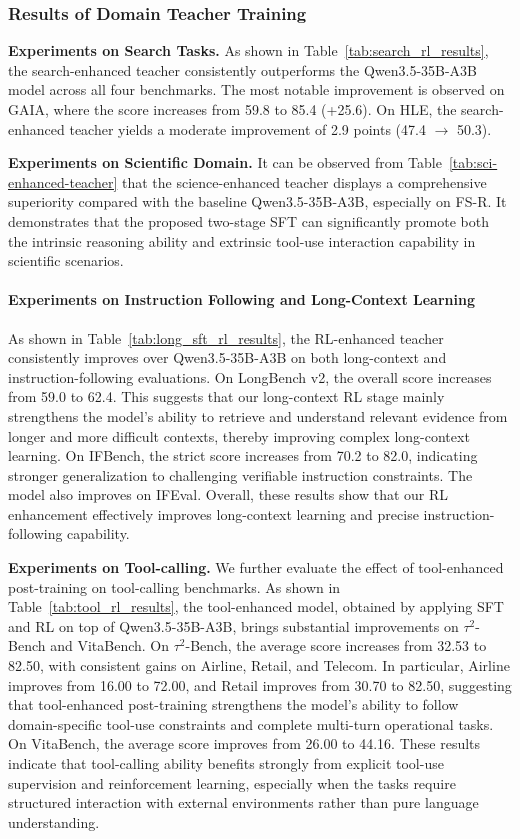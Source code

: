 \subsubsection{Results of Domain Teacher Training} 
\textbf{Experiments on Search Tasks.} As shown in Table~\ref{tab:search_rl_results}, the search-enhanced teacher consistently outperforms the Qwen3.5-35B-A3B model across all four benchmarks. The most notable improvement is observed on GAIA, where the score increases from 59.8 to 85.4 (+25.6). On HLE, the search-enhanced teacher yields a moderate improvement of 2.9 points (47.4 $\to$ 50.3).



\textbf{Experiments on Scientific Domain.} It can be observed from Table~\ref{tab:sci-enhanced-teacher} that the science-enhanced teacher displays a comprehensive superiority compared with the baseline Qwen3.5-35B-A3B, especially on FS-R. It demonstrates that the proposed two-stage SFT can significantly promote both the intrinsic reasoning ability and extrinsic tool-use interaction capability in scientific scenarios. 




\paragraph{Experiments on Instruction Following and Long-Context Learning}
As shown in Table~\ref{tab:long_sft_rl_results}, the RL-enhanced teacher consistently improves over Qwen3.5-35B-A3B on both long-context and instruction-following evaluations. On LongBench v2, the overall score increases from 59.0 to 62.4. This suggests that our long-context RL stage mainly strengthens the model's ability to retrieve and understand relevant evidence from longer and more difficult contexts, thereby improving complex long-context learning. On IFBench, the strict score increases from 70.2 to 82.0, indicating stronger generalization to challenging verifiable instruction constraints. The model also improves on IFEval. Overall, these results show that our RL enhancement effectively improves long-context learning and precise instruction-following capability.

\textbf{Experiments on Tool-calling.} We further evaluate the effect of tool-enhanced post-training on tool-calling benchmarks. As shown in Table~\ref{tab:tool_rl_results}, the tool-enhanced model, obtained by applying SFT and RL on top of Qwen3.5-35B-A3B, brings substantial improvements on $\tau^2$-Bench and VitaBench. On $\tau^2$-Bench, the average score increases from 32.53 to 82.50, with consistent gains on Airline, Retail, and Telecom. In particular, Airline improves from 16.00 to 72.00, and Retail improves from 30.70 to 82.50, suggesting that tool-enhanced post-training strengthens the model's ability to follow domain-specific tool-use constraints and complete multi-turn operational tasks. On VitaBench, the average score improves from 26.00 to 44.16. These results indicate that tool-calling ability benefits strongly from explicit tool-use supervision and reinforcement learning, especially when the tasks require structured interaction with external environments rather than pure language understanding. 

